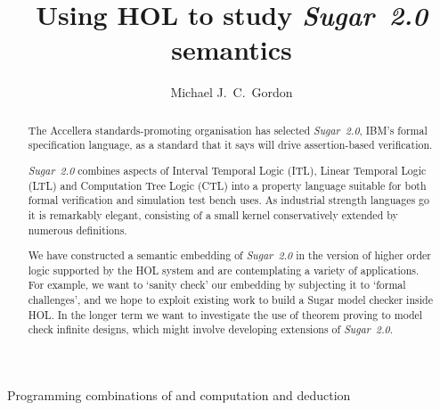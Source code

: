 \documentclass{llncs}
\newcommand\Sugar{{\it{Sugar~2.0}}\xspace}
\newcommand\Hol{HOL\xspace}
\begin{document}
\pagestyle{headings}                  %

\title{Using HOL to study \Sugar semantics}

\titlerunning%
{Programming combinations of%
and computation and deduction}        %
 

\author{Michael J.~C.~Gordon}



\maketitle                            %

\begin{abstract}
The Accellera standards-promoting organisation has selected \Sugar,
IBM's formal specification language, as a standard that it says will
drive assertion-based verification.

\Sugar combines aspects of  Interval
Temporal Logic (ITL), Linear Temporal Logic (LTL) and Computation Tree Logic (CTL) 
into a property
language suitable for both formal verification and simulation test
bench uses. As industrial strength languages go it is remarkably
elegant, consisting of a small kernel conservatively extended by
numerous definitions.

We have constructed a semantic embedding of \Sugar in the version
of higher order logic supported by the \Hol system  and are contemplating
a variety of applications. For example, we want to `sanity check' our embedding
by subjecting it to `formal challenges', and we hope to exploit existing work
to build a Sugar model checker inside \Hol. In the longer term
we want to investigate the use of theorem proving to model check infinite designs,
which might involve developing extensions of \Sugar.
\end{abstract}
\end{document}

